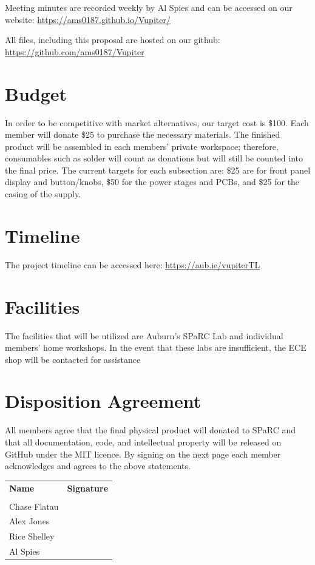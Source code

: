\documentclass[12pt]{article}
\begin{document}
\noindent 
Meeting minutes are recorded weekly by Al Spies and can be accessed on our website: \url{https://ams0187.github.io/Vupiter/}

\noindent
All files, including this proposal are hosted on our github:\\
\url{https://github.com/ams0187/Vupiter}
\section{Budget}
In order to be competitive with market alternatives, our target cost is \$100. 
Each member will donate \$25 to purchase the necessary materials. The finished product will
be assembled in each members’ private workspace; therefore, consumables such as solder will count as
donations but will still be counted into the final price. The current targets for each subsection
are: \$25 are for front panel display and button/knobs, \$50 for the power stages
and PCBs, and \$25 for the casing of the supply.

\section{Timeline}
The project timeline can be accessed here: \url{https://aub.ie/vupiterTL}
\section{Facilities}
The facilities that will be utilized are Auburn’s SPaRC Lab and individual members’ home workshops. In the event that these labs are insufficient, the ECE shop will be contacted for assistance
\section{Disposition Agreement}
All members agree that the final physical product will donated to SPaRC and that all documentation, code, and intellectual property will be released on GitHub under the MIT licence. By signing on the next page each member acknowledges and agrees to the above statements.
\newpage

\begin{table}[H]
\begin{tabular}{ l | c }
    \textbf{Name} & \textbf{Signature} \\
    & \\ [5ex]
    Chase Flatau &\\[10ex]
    Alex Jones &\\[10ex]
    Rice Shelley &\\[10ex]
    Al Spies &\\[10ex]

\end{tabular}
\end{table}
\end{document}
